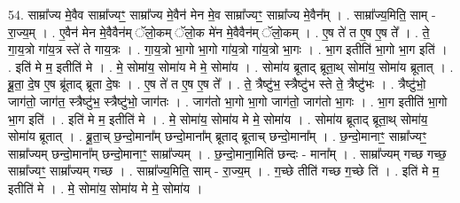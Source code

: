 \documentclass[17pt]{extarticle}
\begin{document}
54. साम्रा᳚ज्य मे॒वैव साम्रा᳚ज्यꣳ॒॒ साम्रा᳚ज्य मे॒वैन॑ मेन मे॒व साम्रा᳚ज्यꣳ॒॒ साम्रा᳚ज्य मे॒वैन᳚म् । . साम्रा᳚ज्य॒मिति॒ साम् - रा॒ज्य॒म् । . ए॒वैन॑ मेन मे॒वैवैन॑म् ॅलो॒कम् ॅलो॒क मे॑न मे॒वैवैन॑म् ॅलो॒कम् । . ए॒ष ते॑ त ए॒ष ए॒ष ते᳚ । . ते॒ गा॒य॒त्रो गा॑य॒त्र स्ते॑ ते गाय॒त्रः । . गा॒य॒त्रो भा॒गो भा॒गो गा॑य॒त्रो गा॑य॒त्रो भा॒गः । . भा॒ग इतीति॑ भा॒गो भा॒ग इति॑ । . इति॑ मे म॒ इतीति॑ मे । . मे॒ सोमा॑य॒ सोमा॑य मे मे॒ सोमा॑य । . सोमा॑य ब्रूताद् ब्रूता॒थ् सोमा॑य॒ सोमा॑य ब्रूतात् । . ब्रू॒ता॒ दे॒ष ए॒ष ब्रू॑ताद् ब्रूता दे॒षः । . ए॒ष ते॑ त ए॒ष ए॒ष ते᳚ । . ते॒ त्रैष्टु॑भ॒ स्त्रैष्टु॑भ स्ते ते॒ त्रैष्टु॑भः । . त्रैष्टु॑भो॒ जाग॑तो॒ जाग॑त॒ स्त्रैष्टु॑भ॒ स्त्रैष्टु॑भो॒ जाग॑तः । . जाग॑तो भा॒गो भा॒गो जाग॑तो॒ जाग॑तो भा॒गः । . भा॒ग इतीति॑ भा॒गो भा॒ग इति॑ । . इति॑ मे म॒ इतीति॑ मे । . मे॒ सोमा॑य॒ सोमा॑य मे मे॒ सोमा॑य । . सोमा॑य ब्रूताद् ब्रूता॒थ् सोमा॑य॒ सोमा॑य ब्रूतात् । . ब्रू॒ता॒च् छ॒न्दो॒माना᳚म् छन्दो॒माना᳚म् ब्रूताद् ब्रूताच् छन्दो॒माना᳚म् । . छ॒न्दो॒मानाꣳ॒॒ साम्रा᳚ज्यꣳ॒॒ साम्रा᳚ज्यम् छन्दो॒माना᳚म् छन्दो॒मानाꣳ॒॒ साम्रा᳚ज्यम् । . छ॒न्दो॒माना॒मिति॑ छन्दः - माना᳚म् । . साम्रा᳚ज्यम् गच्छ गच्छ॒ साम्रा᳚ज्यꣳ॒॒ साम्रा᳚ज्यम् गच्छ । . साम्रा᳚ज्य॒मिति॒ साम् - रा॒ज्य॒म् । . ग॒च्छे तीति॑ गच्छ ग॒च्छे ति॑ । . इति॑ मे म॒ इतीति॑ मे । . मे॒ सोमा॑य॒ सोमा॑य मे मे॒ सोमा॑य । \newline
\end{document}
